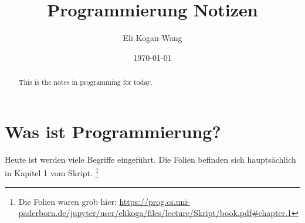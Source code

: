 \documentclass[a4paper,12pt]{article}
\title{Programmierung Notizen}
\author{Eli Kogan-Wang}
\date{\today}
\begin{document}
\renewcommand{\abstractname}{Abstract}

\begin{abstract}
  This is the notes in programming for today.
\end{abstract}




\section*{Was ist Programmierung?}

Heute ist werden viele Begriffe eingeführt.
Die Folien befinden sich hauptsächlich in Kapitel 1 vom Skript.
\footnote{Die Folien waren grob hier: \url{https://prog.cs.uni-paderborn.de/jupyter/user/elikoga/files/lecture/Skript/book.pdf\#chapter.1}}
\end{document}
